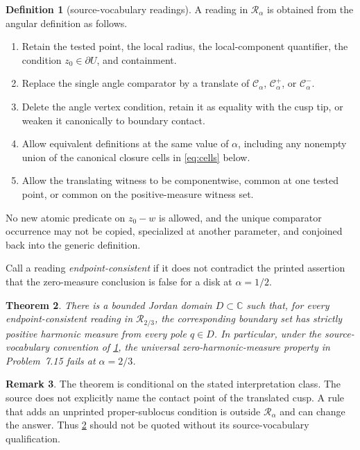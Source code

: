 \documentclass[10pt,reqno]{amsart}
\newtheorem{theorem}{Theorem}[section]
\theoremstyle{definition}
\newtheorem{definition}[theorem]{Definition}
\newtheorem{remark}[theorem]{Remark}
\newcommand{\C}{\mathbb C}
\newcommand{\cC}{\mathcal C}
\newcommand{\cR}{\mathcal R}
\begin{document}
\begin{definition}[source-vocabulary readings]\label{def:readings}
A reading in \(\cR_\alpha\) is obtained from the angular definition as follows.
\begin{enumerate}
\item Retain the tested point, the local radius, the local-component
      quantifier, the condition \(z_0\in\partial U\), and containment.
\item Replace the single angle comparator by a translate of
      \(\cC_\alpha\), \(\cC_\alpha^+\), or \(\cC_\alpha^-\).
\item Delete the angle vertex condition, retain it as equality with the cusp
      tip, or weaken it canonically to boundary contact.
\item Allow equivalent definitions at the same value of \(\alpha\), including
      any nonempty union of the canonical closure cells in
      \cref{eq:cells} below.
\item Allow the translating witness to be componentwise, common at one tested
      point, or common on the positive-measure witness set.
\end{enumerate}
No new atomic predicate on \(z_0-w\) is allowed, and the unique comparator
occurrence may not be copied, specialized at another parameter, and conjoined
back into the generic definition.
\end{definition}

Call a reading \emph{endpoint-consistent} if it does not contradict the
printed assertion that the zero-measure conclusion is false for a disk at
\(\alpha=1/2\).

\begin{theorem}\label{thm:main}
There is a bounded Jordan domain \(D\subset\C\) such that, for every
endpoint-consistent reading in \(\cR_{2/3}\), the corresponding boundary set
has strictly positive harmonic measure from every pole \(q\in D\).
In particular, under the source-vocabulary convention of
\cref{def:readings}, the universal zero-harmonic-measure property in
Problem~7.15 fails at \(\alpha=2/3\).
\end{theorem}

\begin{remark}\label{rem:scope}
The theorem is conditional on the stated interpretation class.  The source
does not explicitly name the contact point of the translated cusp.  A rule
that adds an unprinted proper-sublocus condition is outside
\(\cR_\alpha\) and can change the answer.  Thus \cref{thm:main} should not be
quoted without its source-vocabulary qualification.
\end{remark}
\end{document}
